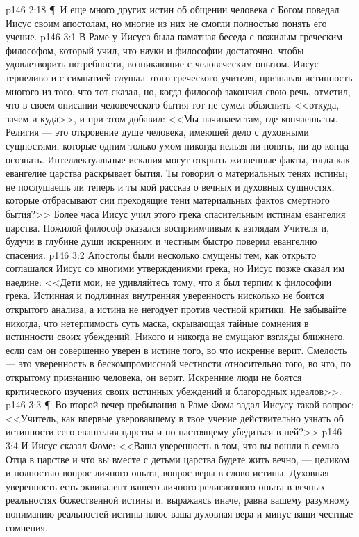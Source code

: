 \vs p146 2:18 \P\ И еще много других истин об общении человека с Богом поведал Иисус своим апостолам, но многие из них не смогли полностью понять его учение.
\vs p146 3:1 В Раме у Иисуса была памятная беседа с пожилым греческим философом, который учил, что науки и философии достаточно, чтобы удовлетворить потребности, возникающие с человеческим опытом. Иисус терпеливо и с симпатией слушал этого греческого учителя, признавая истинность многого из того, что тот сказал, но, когда философ закончил свою речь, отметил, что в своем описании человеческого бытия тот не сумел объяснить <<откуда, зачем и куда>>, и при этом добавил: <<Мы начинаем там, где кончаешь ты. Религия --- это откровение душе человека, имеющей дело с духовными сущностями, которые одним только умом никогда нельзя ни понять, ни до конца осознать. Интеллектуальные искания могут открыть жизненные факты, тогда как евангелие царства раскрывает  бытия. Ты говорил о материальных тенях истины; не послушаешь ли теперь и ты мой рассказ о вечных и духовных сущностях, которые отбрасывают сии преходящие тени материальных фактов смертного бытия?>> Более часа Иисус учил этого грека спасительным истинам евангелия царства. Пожилой философ оказался восприимчивым к взглядам Учителя и, будучи в глубине души искренним и честным быстро поверил евангелию спасения.
\vs p146 3:2 Апостолы были несколько смущены тем, как открыто соглашался Иисус со многими утверждениями грека, но Иисус позже сказал им наедине: <<Дети мои, не удивляйтесь тому, что я был терпим к философии грека. Истинная и подлинная внутренняя уверенность нисколько не боится открытого анализа, а истина не негодует против честной критики. Не забывайте никогда, что нетерпимость суть маска, скрывающая тайные сомнения в истинности своих убеждений. Никого и никогда не смущают взгляды ближнего, если сам он совершенно уверен в истине того, во что искренне верит. Смелость --- это уверенность в бескомпромиссной честности относительно того, во что, по открытому признанию человека, он верит. Искренние люди не боятся критического изучения своих истинных убеждений и благородных идеалов>>.
\vs p146 3:3 \P\ Во второй вечер пребывания в Раме Фома задал Иисусу такой вопрос: <<Учитель, как впервые уверовавшему в твое учение действительно узнать об истинности сего евангелия царства и по\hyp{}настоящему убедиться в ней?>>
\vs p146 3:4 И Иисус сказал Фоме: <<Ваша уверенность в том, что вы вошли в семью Отца в царстве и что вы вместе с детьми царства будете жить вечно, --- целиком и полностью вопрос личного опыта, вопрос веры в слово истины. Духовная уверенность есть эквивалент вашего личного религиозного опыта в вечных реальностях божественной истины и, выражаясь иначе, равна вашему разумному пониманию реальностей истины плюс ваша духовная вера и минус ваши честные сомнения.
